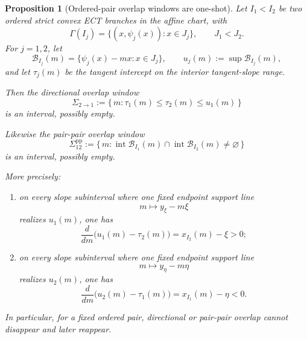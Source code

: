 \documentclass[11pt,a4paper]{amsart}
\theoremstyle{plain}
\newtheorem{proposition}[theorem]{Proposition}
\theoremstyle{definition}
\begin{document}
\begin{proposition}[Ordered-pair overlap windows are one-shot]
\label{prop:ordered-pair-overlap-windows-one-shot}
Let $I_1<I_2$ be two ordered strict convex ECT branches in the affine chart,
with
\[
\Gamma(I_j)=\{(x,\psi_j(x)):x\in J_j\},
\qquad
J_1<J_2.
\]
For $j=1,2$, let
\[
\mathcal B_{I_j}(m)=\{\psi_j(x)-mx:x\in J_j\},
\qquad
u_j(m):=\sup \mathcal B_{I_j}(m),
\]
and let $\tau_j(m)$ be the tangent intercept on the interior tangent-slope
range.

Then the directional overlap window
\[
\Sigma_{2\to 1}
:=
\{\,m:\tau_1(m)\le \tau_2(m)\le u_1(m)\,\}
\]
is an interval, possibly empty.

Likewise the pair-pair overlap window
\[
\Sigma^{\mathrm{pp}}_{12}
:=
\{\,m:\operatorname{int}\mathcal B_{I_1}(m)\cap
\operatorname{int}\mathcal B_{I_2}(m)\neq\varnothing\,\}
\]
is an interval, possibly empty.

More precisely:

\begin{enumerate}
\item on every slope subinterval where one fixed endpoint support line
\[
m\longmapsto y_\xi-m\xi
\]
realizes $u_1(m)$, one has
\[
\frac{d}{dm}\bigl(u_1(m)-\tau_2(m)\bigr)=x_{I_2}(m)-\xi>0;
\]

\item on every slope subinterval where one fixed endpoint support line
\[
m\longmapsto y_\eta-m\eta
\]
realizes $u_2(m)$, one has
\[
\frac{d}{dm}\bigl(u_2(m)-\tau_1(m)\bigr)=x_{I_1}(m)-\eta<0.
\]
\end{enumerate}

In particular, for a fixed ordered pair, directional or pair-pair overlap
cannot disappear and later reappear.
\end{proposition}
\end{document}
